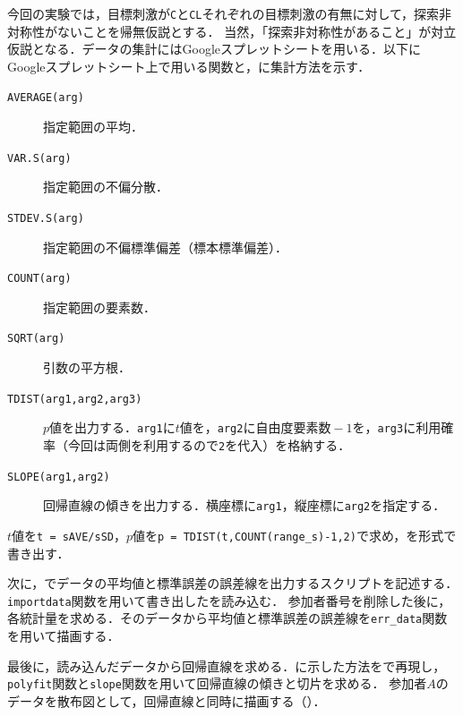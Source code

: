 今回の実験では，目標刺激が\texttt{C}と\texttt{CL}それぞれの目標刺激の有無に対して，探索非対称性がないことを帰無仮説とする．
当然，「探索非対称性があること」が対立仮説となる．データの集計にはGoogleスプレットシートを用いる．以下にGoogleスプレットシート上で用いる関数と，に集計方法を示す．
\begin{multicols}{2}
    \begin{description}
        \item[\texttt{AVERAGE(arg)}] 指定範囲の平均．
        \item[\texttt{VAR.S(arg)}] 指定範囲の不偏分散．
        \item[\texttt{STDEV.S(arg)}] 指定範囲の不偏標準偏差（標本標準偏差）．
        \item[\texttt{COUNT(arg)}] 指定範囲の要素数．
        \item[\texttt{SQRT(arg)}] 引数の平方根．
        \item[\texttt{TDIST(arg1,arg2,arg3)}] \(p\)値を出力する．\texttt{arg1}に\(t\)値を，\texttt{arg2}に自由度\(\textrm{要素数}-1\)を，\texttt{arg3}に利用確率（今回は両側を利用するので\texttt{2}を代入）を格納する．
        \item[\texttt{SLOPE(arg1,arg2)}] 回帰直線の傾きを出力する．横座標に\texttt{arg1}，縦座標に\texttt{arg2}を指定する．
    \end{description}
\end{multicols}

\(t\)値を\texttt{t = sAVE/sSD}，\(p\)値を\texttt{p = TDIST(t,COUNT(range\_s)-1,2)}で求め，を\csv 形式で書き出す．\par
次に，\matlab でデータの平均値と標準誤差の誤差線を出力するスクリプトを記述する．\texttt{importdata}関数を用いて書き出した\csv を読み込む．
参加者番号を削除した後に，各統計量を求める．そのデータから平均値と標準誤差の誤差線を\texttt{err\_data}関数を用いて描画する．\par
最後に，読み込んだデータから回帰直線を求める．に示した方法を\matlab で再現し，\texttt{polyfit}関数と\texttt{slope}関数を用いて回帰直線の傾きと切片を求める．
参加者\(A\)のデータを散布図として，回帰直線と同時に描画する（）．
